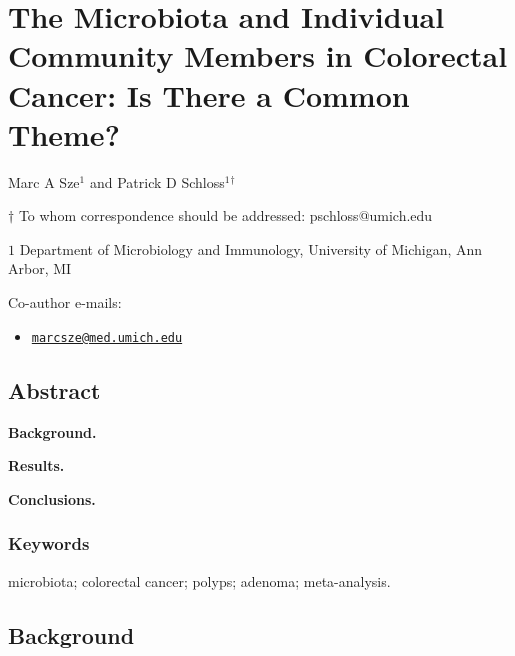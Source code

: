 \documentclass[12pt,]{article}
\title{}
\author{}
\date{}
\providecommand{\tightlist}{%
  \setlength{\itemsep}{0pt}\setlength{\parskip}{0pt}}
\begin{document}
\section{The Microbiota and Individual Community Members in Colorectal
Cancer: Is There a Common
Theme?}\label{the-microbiota-and-individual-community-members-in-colorectal-cancer-is-there-a-common-theme}

\begin{center}
\vspace{25mm}

Marc A Sze${^1}$ and Patrick D Schloss${^1}$${^\dagger}$

\vspace{20mm}

$\dagger$ To whom correspondence should be addressed: pschloss@umich.edu

$1$ Department of Microbiology and Immunology, University of Michigan, Ann Arbor, MI




\end{center}

Co-author e-mails:

\begin{itemize}
\tightlist
\item
  \href{mailto:marcsze@med.umich.edu}{\nolinkurl{marcsze@med.umich.edu}}
\end{itemize}

\newpage

\linenumbers

\subsection{Abstract}\label{abstract}

\textbf{Background.}

\textbf{Results.}

\textbf{Conclusions.}

\subsubsection{Keywords}\label{keywords}

microbiota; colorectal cancer; polyps; adenoma; meta-analysis.

\newpage

\subsection{Background}\label{background}
\end{document}
